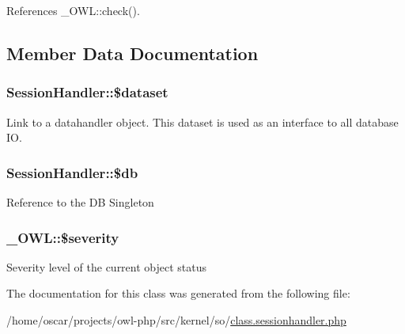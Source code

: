 References \_\-OWL::check().



\subsection{Member Data Documentation}
\subsubsection[{\$dataset}]{\setlength{\rightskip}{0pt plus 5cm}SessionHandler::\$dataset}\label{classSessionHandler_a74c46fcfbadd4c4e6bacc73ddf350056}
Link to a datahandler object. This dataset is used as an interface to all database IO. 
\subsubsection[{\$db}]{\setlength{\rightskip}{0pt plus 5cm}SessionHandler::\$db}\label{classSessionHandler_a0bb7c3206f3664f2a4b8e96edf49a3bc}
Reference to the DB Singleton 
\subsubsection[{\$severity}]{\setlength{\rightskip}{0pt plus 5cm}\_\-OWL::\$severity}\label{class__OWL_ad26b40a9dbbacb33e299b17826f8327c}
Severity level of the current object status 

The documentation for this class was generated from the following file:\begin{DoxyCompactItemize}
\item 
/home/oscar/projects/owl-\/php/src/kernel/so/\hyperlink{class_8sessionhandler_8php}{class.sessionhandler.php}\end{DoxyCompactItemize}
